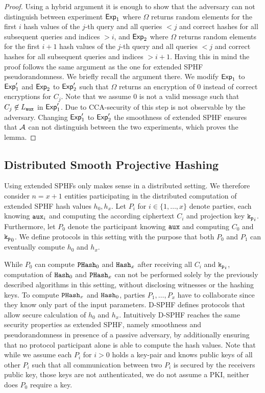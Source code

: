 \begin{proof}
Using a hybrid argument it is enough to show that the adversary can not distinguish between experiment $\mathsf{Exp}_1$ where $\Omega$ returns random elements for the first $i$ hash values of the $j$-th query and all queries $<j$ and correct hashes for all subsequent queries and indices $>i$, and $\mathsf{Exp}_2$ where $\Omega$ returns random elements for the first $i+1$ hash values of the $j$-th query and all queries $<j$ and correct hashes for all subsequent queries and indices $>i+1$.
Having this in mind the proof follows the same argument as the one for extended \ac{SPHF} pseudorandomness.
We briefly recall the argument there.
We modify $\mathsf{Exp}_1$ to $\mathsf{Exp}'_1$ and $\mathsf{Exp}_2$ to $\mathsf{Exp}'_2$ such that $\Omega$ returns an encryption of $0$ instead of correct encryptions for $C_j$.
Note that we assume $0$ is not a valid message such that $C_j\not\in L_\mathtt{aux}$ in $\mathsf{Exp}'_1$.
Due to \ac{CCA}-security of \cL this step is not observable by the adversary.
Changing $\mathsf{Exp}'_1$ to $\mathsf{Exp}'_2$ the smoothness of extended \ac{SPHF} ensures that $\mathcal{A}$ can not distinguish between the two experiments, which proves the lemma.
\end{proof}

\subsection{Distributed Smooth Projective Hashing}\label{sec:dsphf}
Using extended \acp{SPHF} only makes sense in a distributed setting.
We therefore consider $n=x+1$ entities participating in the distributed computation of extended \ac{SPHF} hash values $h_0,h_x$.
Let $P_i$ for $i\in\{1,\dots,x\}$ denote parties, each knowing $\mathtt{aux}_i$ and computing the according ciphertext $C_i$ and projection key $\mathtt{k_p}_i$.
Furthermore, let $P_0$ denote the participant knowing $\mathtt{aux}$ and computing $C_0$ and $\mathtt{k_p}_0$.
We define protocols in this setting with the purpose that both $P_0$ and $P_1$ can eventually compute $h_0$ and $h_x$.

While $P_0$ can compute $\mathtt{PHash}_0$ and $\mathtt{Hash}_x$ after receiving all $C_i$ and $\mathtt{k_p}_i$, computation of $\mathtt{Hash}_0$ and $\mathtt{PHash}_x$ can not be performed solely by the previously described algorithms in this setting, without disclosing witnesses or the hashing keys.
To compute $\mathtt{PHash}_x$ and $\mathtt{Hash}_0$, parties $P_1,\dots,P_x$ have to collaborate since they know only part of the input parameters.
\ac{D-SPHF} defines protocols that allow secure calculation of $h_0$ and $h_x$.
Intuitively \ac{D-SPHF} reaches the same security properties as extended \ac{SPHF}, namely smoothness and pseudorandomness in presence of a passive adversary, by additionally ensuring that no protocol participant alone is able to compute the hash values.
Note that while we assume each $P_i$ for $i>0$ holds a key-pair and knows public keys of all other $P_i$ such that all communication between two $P_i$ is secured by the receivers public key, those keys are not authenticated, \ie we do not assume a \ac{PKI}, neither does $P_0$ require a key.

